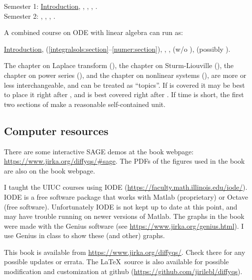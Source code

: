 \noindent
Semester 1:
\hyperref[intro:chapter]{Introduction},
,
,
,
.
\\
Semester 2: 
,
,
,
.

\medskip

A combined course on ODE with linear algebra can run as:

\medskip

\noindent
\hyperref[intro:chapter]{Introduction},
 (\ref{integralsols:section}--\ref{numer:section}),
,
,
 (w/o ), (possibly 
).

\medskip

The chapter on
Laplace transform (),
the chapter on Sturm-Liouville (),
the chapter on power series (),
and the chapter on nonlinear systems (),
are more or less interchangeable, and can be treated as ``topics''.
If  is covered it may be best to place it right 
after ,
and  is best covered right after
.
If time is short, the first two sections of
 make a reasonable self-contained unit.

\subsection{Computer resources}

There are some interactive SAGE demos at the book webpage:
\url{https://www.jirka.org/diffyqs/#sage}. The PDFs of the
figures used in the book are also on the book webpage.

I taught the UIUC courses using IODE
(\url{https://faculty.math.illinois.edu/iode/}).
IODE is a free software package that
works with Matlab (proprietary) or Octave (free software).
Unfortunately IODE is not kept up to date at this point, and may have
trouble running on newer versions of Matlab.
The graphs in the book were made with
the Genius software
(see \url{https://www.jirka.org/genius.html}).  I use Genius
in class to show these (and other) graphs.

This book
is available from
\url{https://www.jirka.org/diffyqs/}.  Check there for any possible
updates or errata.  The \LaTeX\ source is also available
for possible modification and customization
at github (\url{https://github.com/jirilebl/diffyqs}).

